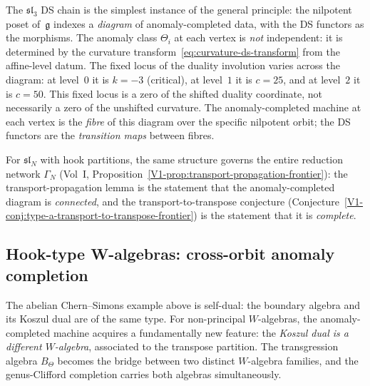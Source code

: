 \begin{remark}
The $\mathfrak{sl}_3$ DS chain is the simplest instance of
the general principle: the nilpotent poset of~$\mathfrak g$
indexes a \emph{diagram} of anomaly-completed data, with the
DS functors as the morphisms. The anomaly class $\Theta_i$ at
each vertex is \emph{not} independent: it is determined by the
curvature transform~\eqref{eq:curvature-ds-transform} from
the affine-level datum. The fixed locus of the duality involution
varies across the diagram: at level~$0$ it is $k=-3$
(critical), at level~$1$ it is $c=25$, and at level~$2$ it
is $c=50$. This fixed locus is a zero of the shifted duality
coordinate, not necessarily a zero of the unshifted curvature.
The anomaly-completed machine at each vertex is
the \emph{fibre} of this diagram over the specific nilpotent
orbit; the DS functors are the \emph{transition maps} between
fibres.

For $\mathfrak{sl}_N$ with hook partitions, the same
structure governs the entire reduction network $\Gamma_N$
(Vol~I, Proposition~\ref*{V1-prop:transport-propagation-frontier}):
the transport-propagation lemma is the statement that the
anomaly-completed diagram is \emph{connected}, and the
transport-to-transpose conjecture
(Conjecture~\ref*{V1-conj:type-a-transport-to-transpose-frontier})
is the statement that it is \emph{complete}.
\end{remark}

\subsection{Hook-type W-algebras: cross-orbit anomaly completion}

The abelian Chern--Simons example above is self-dual: the boundary
algebra and its Koszul dual are of the same type. For non-principal
$W$-algebras, the anomaly-completed machine acquires a fundamentally
new feature: the \emph{Koszul dual is a different $W$-algebra},
associated to the transpose partition. The transgression algebra
$B_\Theta$ becomes the bridge between two distinct $W$-algebra families,
and the genus-Clifford completion carries both algebras simultaneously.

